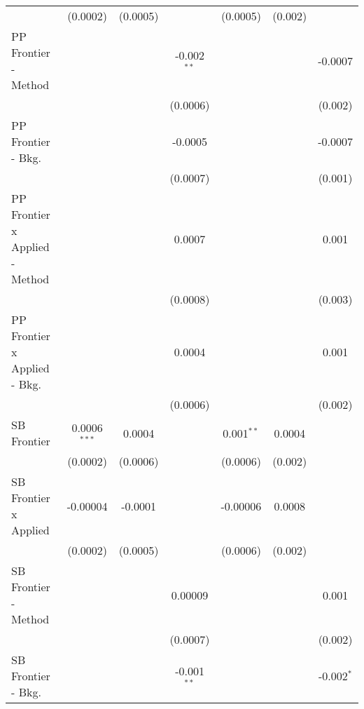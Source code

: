 \begin{tabular}{lcccccc}
                                  & (0.0002)       & (0.0005)      &               & (0.0005)       & (0.002)        &   \\   
   PP Frontier - Method           &                &               & -0.002$^{**}$ &                &                & -0.0007\\   
                                  &                &               & (0.0006)      &                &                & (0.002)\\   
   PP Frontier - Bkg.             &                &               & -0.0005       &                &                & -0.0007\\   
                                  &                &               & (0.0007)      &                &                & (0.001)\\   
   PP Frontier x Applied - Method &                &               & 0.0007        &                &                & 0.001\\   
                                  &                &               & (0.0008)      &                &                & (0.003)\\   
   PP Frontier x Applied - Bkg.   &                &               & 0.0004        &                &                & 0.001\\   
                                  &                &               & (0.0006)      &                &                & (0.002)\\   
   SB Frontier                    & 0.0006$^{***}$ & 0.0004        &               & 0.001$^{**}$   & 0.0004         &   \\   
                                  & (0.0002)       & (0.0006)      &               & (0.0006)       & (0.002)        &   \\   
   SB Frontier x Applied          & -0.00004       & -0.0001       &               & -0.00006       & 0.0008         &   \\   
                                  & (0.0002)       & (0.0005)      &               & (0.0006)       & (0.002)        &   \\   
   SB Frontier - Method           &                &               & 0.00009       &                &                & 0.001\\   
                                  &                &               & (0.0007)      &                &                & (0.002)\\   
   SB Frontier - Bkg.             &                &               & -0.001$^{**}$ &                &                & -0.002$^{*}$\\   

\end{tabular}
